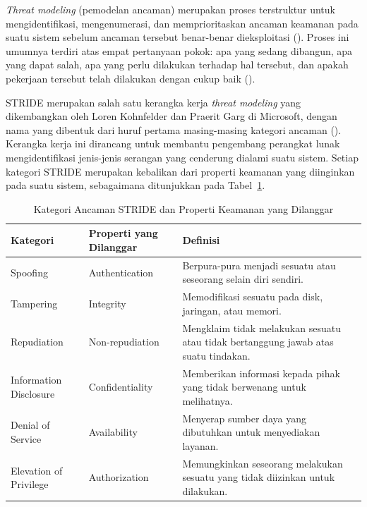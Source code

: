 \textit{Threat modeling} (pemodelan ancaman) merupakan proses
terstruktur untuk mengidentifikasi, mengenumerasi, dan memprioritaskan
ancaman keamanan pada suatu sistem sebelum ancaman tersebut
benar-benar dieksploitasi (\cite{shostack2014}). Proses ini umumnya
terdiri atas empat pertanyaan pokok: apa yang sedang dibangun, apa
yang dapat salah, apa yang perlu dilakukan terhadap hal tersebut, dan
apakah pekerjaan tersebut telah dilakukan dengan cukup baik
(\cite{shostack2014}).

STRIDE merupakan salah satu kerangka kerja \textit{threat modeling}
yang dikembangkan oleh Loren Kohnfelder dan Praerit Garg di Microsoft,
dengan nama yang dibentuk dari huruf pertama masing-masing kategori
ancaman (\cite{shostack2014}). Kerangka kerja ini dirancang untuk
membantu pengembang perangkat lunak mengidentifikasi jenis-jenis
serangan yang cenderung dialami suatu sistem. Setiap kategori STRIDE
merupakan kebalikan dari properti keamanan yang diinginkan pada suatu
sistem, sebagaimana ditunjukkan pada Tabel~\ref{tab:stride-kategori}.

\begin{table}[h]
\centering
\caption{Kategori Ancaman STRIDE dan Properti Keamanan yang Dilanggar}
\label{tab:stride-kategori}
\begin{tabular}{|p{2.5cm}|p{3cm}|p{7cm}|}
\hline
\textbf{Kategori} & \textbf{Properti yang Dilanggar} &
\textbf{Definisi} \\
\hline
Spoofing & Authentication &
Berpura-pura menjadi sesuatu atau seseorang selain diri sendiri. \\
\hline
Tampering & Integrity &
Memodifikasi sesuatu pada disk, jaringan, atau memori. \\
\hline
Repudiation & Non-repudiation &
Mengklaim tidak melakukan sesuatu atau tidak bertanggung jawab atas
suatu tindakan. \\
\hline
Information Disclosure & Confidentiality &
Memberikan informasi kepada pihak yang tidak berwenang untuk
melihatnya. \\
\hline
Denial of Service & Availability &
Menyerap sumber daya yang dibutuhkan untuk menyediakan layanan. \\
\hline
Elevation of Privilege & Authorization &
Memungkinkan seseorang melakukan sesuatu yang tidak diizinkan untuk
dilakukan. \\
\hline
\end{tabular}
\end{table}

